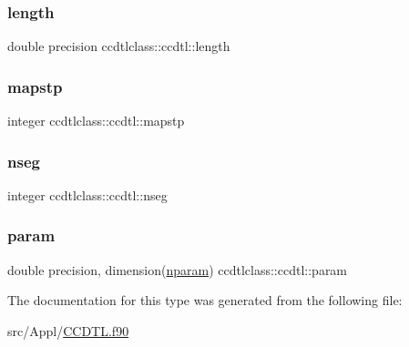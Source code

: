 \subsubsection{\texorpdfstring{length}{length}}
{\footnotesize\ttfamily double precision ccdtlclass\+::ccdtl\+::length}

\mbox{\label{structccdtlclass_1_1ccdtl_a646c337f17e8c188638d58449ea92b99}} 
\subsubsection{\texorpdfstring{mapstp}{mapstp}}
{\footnotesize\ttfamily integer ccdtlclass\+::ccdtl\+::mapstp}

\mbox{\label{structccdtlclass_1_1ccdtl_a56759205b010998a69c2716e35e0d6d6}} 
\subsubsection{\texorpdfstring{nseg}{nseg}}
{\footnotesize\ttfamily integer ccdtlclass\+::ccdtl\+::nseg}

\mbox{\label{structccdtlclass_1_1ccdtl_a6b125e6ca6440736ab2272ad373cc24d}} 
\subsubsection{\texorpdfstring{param}{param}}
{\footnotesize\ttfamily double precision, dimension(\mbox{\hyperlink{namespaceccdtlclass_a0e8e95c86f2dab6639fc79f05859b6ea}{nparam}}) ccdtlclass\+::ccdtl\+::param}



The documentation for this type was generated from the following file\+:\begin{DoxyCompactItemize}
\item 
src/\+Appl/\mbox{\hyperlink{_c_c_d_t_l_8f90}{C\+C\+D\+T\+L.\+f90}}\end{DoxyCompactItemize}
